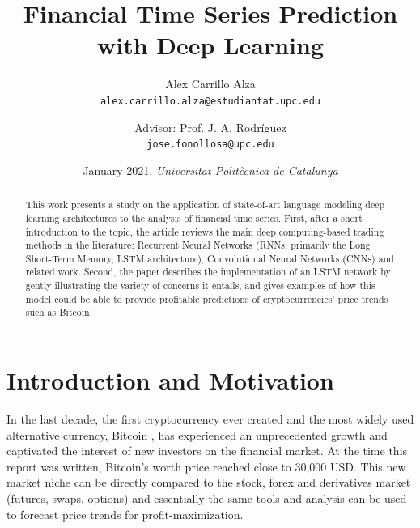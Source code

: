 \documentclass[10pt,twocolumn,letterpaper]{article}
\begin{document}
\title{Financial Time Series Prediction with Deep Learning}

\author{Alex Carrillo Alza\\
{\tt\small alex.carrillo.alza@estudiantat.upc.edu}
\and
Advisor: Prof. J. A. Rodríguez\\
{\tt\small jose.fonollosa@upc.edu}
\and
January 2021, \textit{Universitat Politècnica de Catalunya}\\
}

\date{\vspace{-5ex}}

\maketitle

\begin{abstract}
	This work presents a study on the application of state-of-art language modeling deep learning architectures to the analysis of financial time series. First, after a short introduction to the topic, the article reviews the main deep computing-based trading methods in the literature: Recurrent Neural Networks (RNNs; primarily the Long Short-Term Memory, LSTM architecture), Convolutional Neural Networks (CNNs) and related work. Second, the paper describes the implementation of an LSTM network by gently illustrating the variety of concerns it entails, and gives examples of how this model could be able to provide profitable predictions of cryptocurrencies' price trends such as Bitcoin.
\end{abstract}

\section{Introduction and Motivation}

In the last decade, the first cryptocurrency ever created and the most widely used alternative currency, Bitcoin \cite{bitcoin}, has experienced an unprecedented growth and captivated the interest of new investors on the financial market. At the time this report was written, Bitcoin’s worth price reached close to 30,000 USD. This new market niche can be directly compared to the stock, forex and derivatives market (futures, swaps, options) and essentially the same tools and analysis can be used to forecast price trends for profit-maximization.
\end{document}
